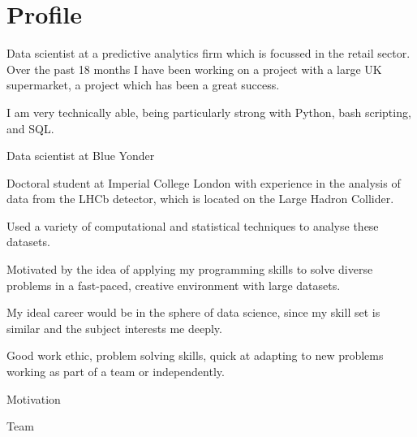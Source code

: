 \section{Profile}



Data scientist at a predictive analytics firm which is focussed in the retail sector.
Over the past 18 months I have been working on a project with a large UK supermarket, a project
which has been a great success.

I am very technically able, being particularly strong with Python, bash scripting, and SQL.



  Data scientist at Blue Yonder


  Doctoral student at Imperial College London with experience in the analysis of data
  from the LHCb detector, which is located on the Large Hadron Collider.

  Used a variety of computational and statistical techniques to analyse these datasets.

  Motivated by the idea of applying my programming skills to
  solve diverse problems in a fast-paced, creative environment with large datasets.

  My ideal career would be in the sphere of data science, since my skill set is similar and
  the subject interests me deeply.

  Good work ethic, problem solving skills, quick at adapting to new problems working as part of a
  team or independently.


  Motivation


  Team

















